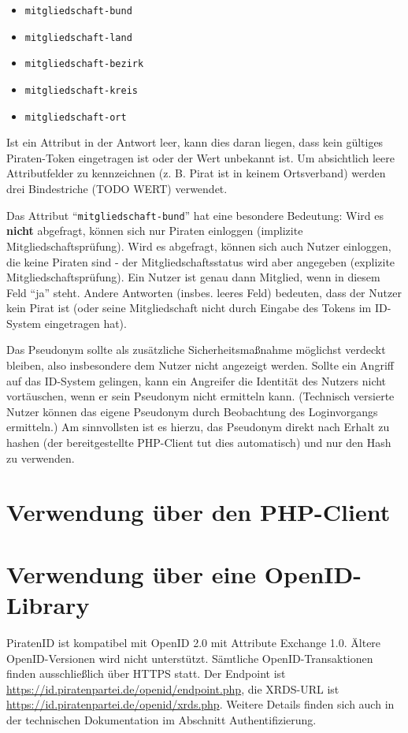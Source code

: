 \documentclass[parskip=half]{scrartcl}
\begin{document}
\begin{itemize}
	\item \texttt{mitgliedschaft-bund}
	\item \texttt{mitgliedschaft-land}
	\item \texttt{mitgliedschaft-bezirk}
	\item \texttt{mitgliedschaft-kreis}
	\item \texttt{mitgliedschaft-ort}
\end{itemize}

Ist ein Attribut in der Antwort leer, kann dies daran liegen, dass kein gültiges Piraten-Token eingetragen ist oder der Wert unbekannt ist.
Um absichtlich leere Attributfelder zu kennzeichnen (z. B. Pirat ist in keinem Ortsverband) werden drei Bindestriche (TODO WERT) verwendet.

Das Attribut "`\texttt{mitgliedschaft-bund}"' hat eine besondere Bedeutung:
Wird es \textbf{nicht} abgefragt, können sich nur Piraten einloggen (implizite Mitgliedschaftsprüfung).
Wird es abgefragt, können sich auch Nutzer einloggen, die keine Piraten sind - der Mitgliedschaftsstatus wird aber angegeben (explizite Mitgliedschaftsprüfung).
Ein Nutzer ist genau dann Mitglied, wenn in diesem Feld "`ja"' steht.
Andere Antworten (insbes. leeres Feld) bedeuten, dass der Nutzer kein Pirat ist (oder seine Mitgliedschaft nicht durch Eingabe des Tokens im ID-System eingetragen hat).


Das Pseudonym sollte als zusätzliche Sicherheitsmaßnahme möglichst verdeckt bleiben, also insbesondere dem Nutzer nicht angezeigt werden.
Sollte ein Angriff auf das ID-System gelingen, kann ein Angreifer die Identität des Nutzers nicht vortäuschen, wenn er sein Pseudonym nicht ermitteln kann.
(Technisch versierte Nutzer können das eigene Pseudonym durch Beobachtung des Loginvorgangs ermitteln.)
Am sinnvollsten ist es hierzu, das Pseudonym direkt nach Erhalt zu hashen (der bereitgestellte PHP-Client tut dies automatisch) und nur den Hash zu verwenden.


\newpage
\section{Verwendung über den PHP-Client}


\newpage
\section{Verwendung über eine OpenID-Library}
PiratenID ist kompatibel mit OpenID 2.0 mit Attribute Exchange 1.0. Ältere OpenID-Versionen wird nicht unterstützt.
Sämtliche OpenID-Transaktionen finden ausschließlich über HTTPS statt.
Der Endpoint ist \url{https://id.piratenpartei.de/openid/endpoint.php}, die XRDS-URL ist \url{https://id.piratenpartei.de/openid/xrds.php}.
Weitere Details finden sich auch in der technischen Dokumentation im Abschnitt Authentifizierung.
\end{document}
